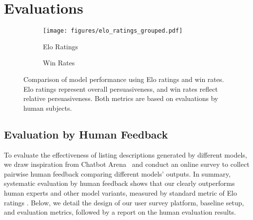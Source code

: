 

\section{Evaluations}
\label{sec: evaluation}

\begin{figure*}[h]
    \centering
    \hspace{0.7cm}
    \begin{subfigure}[t]{0.8\linewidth}
        \centering
        \texttt{[image: figures/elo\_ratings\_grouped.pdf]}
        \caption{Elo Ratings}
        \label{fig:elo}
    \end{subfigure}
    \hspace{-3.3cm}
    \begin{subfigure}[t]{0.32\linewidth}
        \centering
        \caption{Win Rates}
        \label{fig:win_rates}
    \end{subfigure}
    \caption{Comparison of model performance using Elo ratings and win rates. Elo ratings represent overall persuasiveness, and win rates reflect relative persuasiveness. Both metrics are based on evaluations by human subjects.}
    \vspace{-0.4cm}
    \label{fig:main_exp}
\end{figure*}

\subsection{Evaluation by Human Feedback}
\label{sec:survey}
To evaluate the effectiveness of listing descriptions generated by different models, we draw inspiration from Chatbot Arena~\citep{zheng2023judging} and conduct an online survey to collect pairwise human feedback comparing different models' outputs.  In summary, systematic evaluation by human feedback shows that our \agentname  clearly outperforms human experts and other model variants, measured by standard metric of Elo ratings \citep{elo1967proposed}. Below, we detail the design of our user survey platform, baseline setup, and evaluation metrics, followed by a report on the human evaluation results.   


